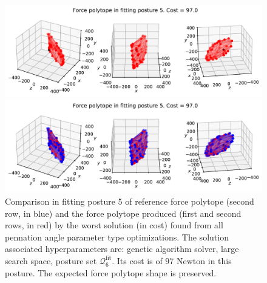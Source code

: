 \begin{figure}[!htb]
    \centering
    \captionsetup{justification=centering}
    
    \begin{minipage}{1\linewidth}
        \captionsetup{justification=centering}
        \centering
        \includegraphics[trim={0 0 0 0}, clip, width=1\linewidth]{img/chapter_4/reconstruction_stanford_imgs/polytope_genetic_p6_pen_large_output_3215217_trial_4_fitting_posture_5.pdf}
    \end{minipage}
    \begin{minipage}{1\linewidth}
        \captionsetup{justification=centering}
        \centering
        \includegraphics[trim={0 0 0 20}, clip, width=1\linewidth]{img/chapter_4/reconstruction_stanford_imgs/polytope_genetic_p6_pen_large_output_3215217_trial_4_fitting_posture_5_with_stanford.pdf}
    \end{minipage}
    \caption{Comparison in fitting posture 5 of reference force polytope (second row, in blue) and the force polytope produced (first and second rows, in red) by the worst solution (in cost) found from all pennation angle parameter type optimizations. The solution associated hyperparameters are: genetic algorithm solver, large search space, posture set $\mathcal{Q}_6^{\text{fit}}$. Its cost is of $97$ Newton in this posture. The expected force polytope shape is preserved.}
    \label{fig:polytope_genetic_p6_pen_large_output_3215217_trial_4_fitting_posture_5}
\end{figure}

